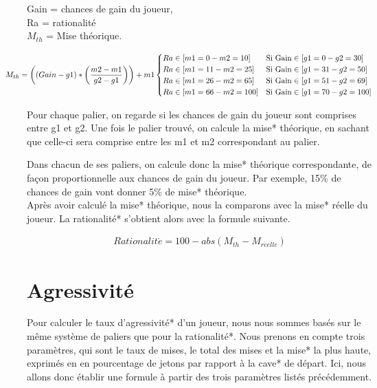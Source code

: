 \documentclass{report}
\begin{document}
\small{
\begin{center}

Gain = chances de gain du joueur,\\
Ra = rationalité\\
$M_{th}$ = Mise théorique.\\

\end{center}
\begin{align*}
	\hspace{-1cm}M_{th} = \left((Gain - g1) * \left(\frac{m2-m1}{g2-g1}\right)\right)+m1
	\begin{cases}
		Ra \in [m1=0 - m2=10] &\text{Si Gain} \in [g1=0 - g2=30]\\
		Ra \in [m1=11 - m2=25] &\text{Si Gain} \in [g1=31 - g2=50]\\
		Ra \in [m1=26 - m2=65] &\text{Si Gain} \in [g1=51 - g2=69]\\
		Ra \in [m1=66 - m2=100] &\text{Si Gain} \in [g1=70 - g2=100]\\
	\end{cases}
\end{align*}
}

Pour chaque palier, on regarde si les chances de gain du joueur sont comprises entre g1 et g2. Une fois le palier trouvé, on calcule la mise* théorique, en sachant que celle-ci sera comprise entre les m1 et m2 correspondant au palier. \par
Dans chacun de ses paliers, on calcule donc la mise* théorique correspondante, de façon proportionnelle aux chances de gain du joueur. Par exemple, 15\% de chances de gain vont donner 5\% de mise* théorique.\\
	
Après avoir calculé la mise* théorique, nous la comparons avec la mise* réelle du joueur. La rationalité* s’obtient alors avec la formule suivante. \par

\begin{align*}
Rationalit\acute{e} = 100-abs(M_{th}-M_{r\acute{e}elle})
\end{align*}



\section{Agressivité}

\hspace{0.5cm}Pour calculer le taux d'agressivité* d'un joueur, nous nous sommes basés sur le même système de paliers que pour la rationalité*. Nous prenons en compte trois paramètres, qui sont le taux de mises, le total des mises et la mise* la plus haute, exprimés en en pourcentage de jetons par rapport à la cave* de départ. Ici, nous allons donc établir une formule à partir des trois paramètres listés précédemment.\\
\end{document}
